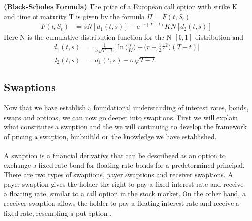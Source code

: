 \begin{proposition}
    \textbf{(Black-Scholes Formula)} The price of a European call option with strike K and time of maturity T 
    is given by the formula $\Pi$ = $F(t,S_t)$
    \begin{align*}
        F(t,S_t) & =s N[d_1(t,s)] -e^{-r(T-t)}KN[d_2(t,s)] 
    \end{align*}
    Here N is the cumulative distribution function for the N $[0,1]$ distribution and 
    \begin{align*}
        d_1(t,s) &= \frac{1}{\sigma \sqrt{T-t}} \Big[ \ln \Big(\frac{s}{K} \Big) +  \Big(r + \frac{1}{2} \sigma^2)(T-t)  \Big] \\
        d_2(t,s) &= d_1(t,s)-\sigma \sqrt{T-t}
    \end{align*}
    \label{Black-Scholes Formula}
    \cite{Bjork}
\end{proposition}
\subsection{Swaptions}
Now that we have establish a foundational understanding of interest rates, bonds, swaps and options, we can
now go deeper into swaptions. First we will explain what constitutes a swaption and the we will continuing 
to develop the framework of pricing a swaption, buibuiltld on the knowledge we have established.  
\\\\
A swaption is a financial derivative that can be describeed as an option to exchange a fixed rate bond for
floating rate bonds for a predetermined principal. 
There are two types of swaptions, payer swaptions and receiver swaptions.
A payer swaption gives the holder the right to pay a fixed interest rate and receive a floating rate, 
similar to a call option in the stock market. On the other hand, a receiver swaption allows the holder
to pay a floating interest rate and receive a fixed rate, resembling a put option \cite{Lindstrom} .

